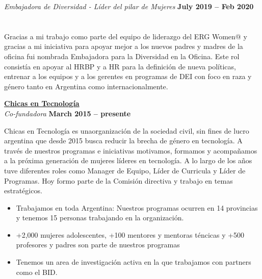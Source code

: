 \documentclass[margin,line]{resume}
\begin{document}
\begin{resume}
\textsl{Embajadora de Diversidad - L\'ider del pilar de Mujeres} 
 \hfill \textbf{July 2019 -- Feb 2020}\vspace{-3mm}\\\vspace{-1mm}
\hfill \vspace{-3mm}\\\vspace{-1mm}
\\
Gracias a mi trabajo como parte del equipo de liderazgo del ERG  Women@ y gracias a mi iniciativa para apoyar mejor a los nuevos padres y madres de la oficina fui nombrada Embajadora para la Diversidad en la Oficina. Este rol consist\'ia en apoyar al HRBP y a HR para la definici\'on de nueva pol\'iticas, entrenar a los equipos y a los gerentes en programas de DEI con foco en raza y g\'enero tanto en Argentina como internacionalmente.



\textbf{\href{http://www.chicasentecnologia.org/}{Chicas en Tecnolog\'ia}}\\\vspace{1mm}
\textsl{Co-fundadora } \hfill \textbf{March 2015 -- presente}\vspace{-3mm}\\\vspace{-1mm}

Chicas en Tecnolog\'ia es unaorganizaci\'on de la sociedad civil, sin fines de lucro argentina que desde 2015 busca reducir la brecha de g\'enero en tecnolog\'ia. A trav\'es de nuestros programas e iniciativas motivamos, formamos y acompa\~namos a la pr\'oxima generaci\'on de mujeres l\'ideres en tecnolog\'ia. A lo largo de los a\~nos tuve diferentes roles como Manager de Equipo, L\'ider de Curricula y L\'ider de Programas. Hoy formo parte de la Comisi\'on directiva y trabajo en temas estrat\'egicos.

\begin{itemize}

\item Trabajamos en toda Argentina: Nuestros programas ocurren en 14 provincias y tenemos 15 personas trabajando en la organizaci\'on. 

\item  +2,000 mujeres adolescentes,  +100  mentores y mentoras t\'encicas y +500 profesores y padres son parte de nuestros programas

\item Tenemos un area de investigaci\'on activa en la que trabajamos con partners como el BID.


\end{itemize}
\end{resume}
\end{document}
